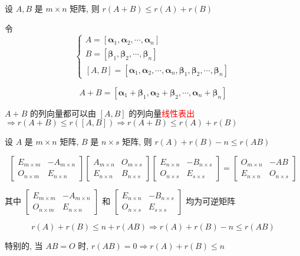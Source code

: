 \begin{proposition}
	设 $A,B$ 是 $m\times n$ 矩阵,  则 $r(A + B)\leq r(A) + r(B)$
\end{proposition}
\begin{anymark}[证明]

	令 $$
	\begin{cases}
		A = [\boldsymbol{\alpha}_{1}, \boldsymbol{\alpha}_{2}, \cdots, \boldsymbol{\alpha}_{n}]\\
		B = [\boldsymbol{\beta}_{1}, \boldsymbol{\beta}_{2}, \cdots, \boldsymbol{\beta}_{n}]\\
		[A,B] = [\boldsymbol{\alpha}_{1}, \boldsymbol{\alpha}_{2}, \cdots, \boldsymbol{\alpha}_{n}, 
		\boldsymbol{\beta}_{1}, \boldsymbol{\beta}_{2}, \cdots, \boldsymbol{\beta}_{n}]
	\end{cases}$$

	$$A + B = [\boldsymbol{\alpha}_{1} + \boldsymbol{\beta}_{1}, \boldsymbol{\alpha}_{2} + \boldsymbol{\beta}_{2}, \cdots, \boldsymbol{\alpha}_{n} + \boldsymbol{\beta}_{n}]$$

	$A+B$ 的列向量都可以由 $[A,B]$ 的列向量\textcolor{red}{线性表出} $\Rightarrow r(A+B)\leq r([A,B])\Rightarrow r(A+B)\leq r(A)+r(B)$
\end{anymark}

\begin{proposition}
	设 $A$ 是 $m\times n$ 矩阵, $B$ 是 $n\times s$ 矩阵, 则 $r(A) + r(B) - n \leq r(AB)$
\end{proposition}
\begin{anymark}[证明]

	$$\begin{bmatrix}
		E_{m\times m} & -A_{m\times n}\\
		O_{n\times m} & E_{n\times n}
	\end{bmatrix} 
	\begin{bmatrix}
		A_{m\times n} & O_{m\times s}\\
		E_{n\times n} & B_{n\times s}
	\end{bmatrix}
	\begin{bmatrix}
		E_{n\times n} & -B_{n\times s}\\
		O_{n\times s} & E_{s\times s}
	\end{bmatrix} = 
	\begin{bmatrix}
		O_{m\times n} & -AB \\
		E_{n\times n} & O_{n\times s}
	\end{bmatrix}$$

	其中 $\begin{bmatrix}
		E_{m\times m} & -A_{m\times n}\\
		O_{n\times m} & E_{n\times n}
	\end{bmatrix}$ 和 $\begin{bmatrix}
		E_{n\times n} & -B_{n\times s}\\
		O_{n\times s} & E_{s\times s}
	\end{bmatrix}$ 均为可逆矩阵
	
	$$r(A) + r(B) \leq n + r(AB) \Rightarrow r(A) + r(B) -n \leq r(AB)$$

	特别的, 当 $AB = O$ 时, $r(AB) = 0\Rightarrow r(A) + r(B) \leq n$ 
\end{anymark}

